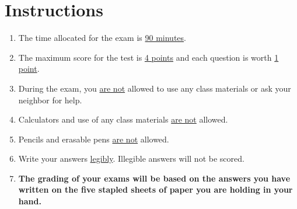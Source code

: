\section*{Instructions}
\begin{enumerate}
    \item The time allocated for the exam is \underline{90 minutes}.
    \item The maximum score for the test is \underline{4 points} and each question is worth \underline{1 point}.
    \item During the exam, you \underline{are not} allowed to use any class materials or ask your neighbor for help.
    \item Calculators and use of any class materials \underline{are not} allowed.
    \item Pencils and erasable pens \underline{are not} allowed.
    \item Write your answers \underline{legibly}. Illegible answers will not be scored.
    \item \textbf{The grading of your exams will be based on the answers you have written on the five stapled sheets of paper you are holding in your hand.}
    \vfill
\end{enumerate}